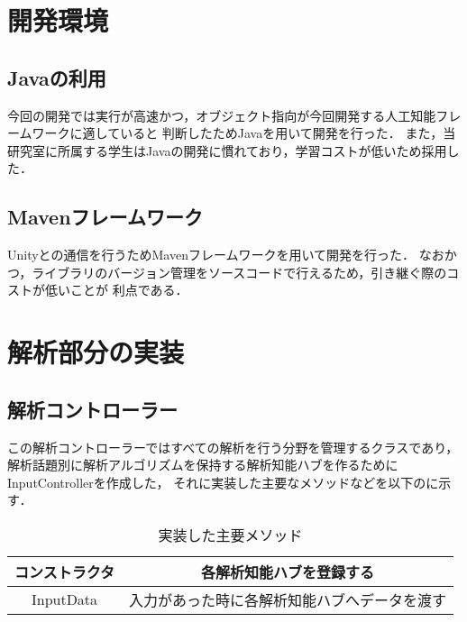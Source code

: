 
\section{開発環境}
\subsection{Javaの利用}
今回の開発では実行が高速かつ，オブジェクト指向が今回開発する人工知能フレームワークに適していると
判断したためJavaを用いて開発を行った．
また，当研究室に所属する学生はJavaの開発に慣れており，学習コストが低いため採用した．

\subsection{Mavenフレームワーク}
Unityとの通信を行うためMavenフレームワークを用いて開発を行った．
なおかつ，ライブラリのバージョン管理をソースコードで行えるため，引き継ぐ際のコストが低いことが
利点である．

\section{解析部分の実装}
\subsection{解析コントローラー}
この解析コントローラーではすべての解析を行う分野を管理するクラスであり，
解析話題別に解析アルゴリズムを保持する解析知能ハブを作るためにInputControllerを作成した，
それに実装した主要なメソッドなどを以下のに示す．

\begin{table}[tbh]
	\caption{実装した主要メソッド} \label{tab:InputController}
	\begin{center}
		\begin{tabular}[htb]{c|c}
		\hline
		コンストラクタ & 各解析知能ハブを登録する \\
		\hline
		InputData & 入力があった時に各解析知能ハブへデータを渡す \\
		\hline
		\end{tabular}
	\end{center}
\end{table}


